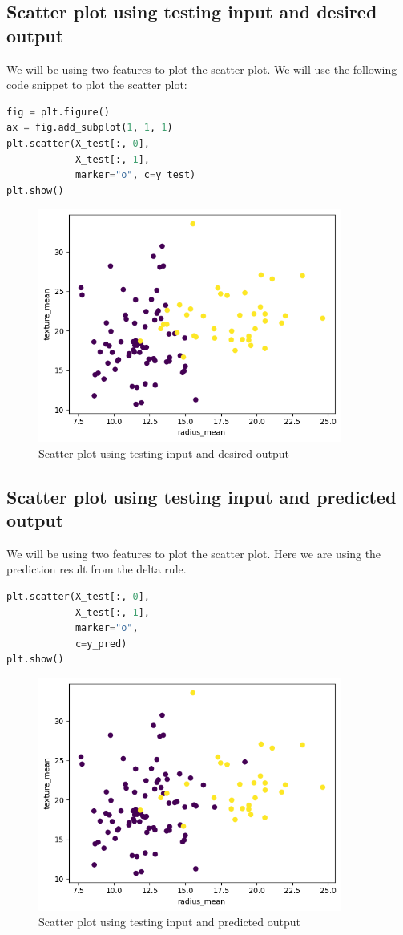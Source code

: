 \subsection{Scatter plot using testing input and desired output}
We will be using two features to plot the scatter plot. We will use the following code snippet to plot the scatter plot:
\begin{lstlisting}[language=Python]
fig = plt.figure()
ax = fig.add_subplot(1, 1, 1)
plt.scatter(X_test[:, 0],
            X_test[:, 1],
            marker="o", c=y_test)
plt.show()
\end{lstlisting}
\begin{figure}[ht]
    \centering
    \includegraphics[width=10cm]{ch/figures/scatter1.png}
    \caption{Scatter plot using testing input and desired output}
    \label{fig:scatter1}
\end{figure}
\subsection{Scatter plot using testing input and predicted output}
We will be using two features to plot the scatter plot. Here we are using the prediction result from the delta rule.
\begin{lstlisting}[language=Python]
plt.scatter(X_test[:, 0],
            X_test[:, 1], 
            marker="o", 
            c=y_pred)
plt.show()
\end{lstlisting}
\begin{figure}[ht]
    \centering
    \includegraphics[width=10cm]{ch/figures/scatter2.png}
    \caption{Scatter plot using testing input and predicted output}
    \label{fig:scatter2}
\end{figure}

